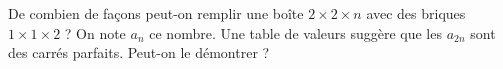 De combien de façons peut-on remplir une boîte $2 \times 2 \times n$ avec des briques $1 \times 1 \times 2$ ? On note $a_n$ ce nombre. Une table de valeurs suggère que les $a_{2n}$ sont des carrés parfaits. Peut-on le démontrer ?
